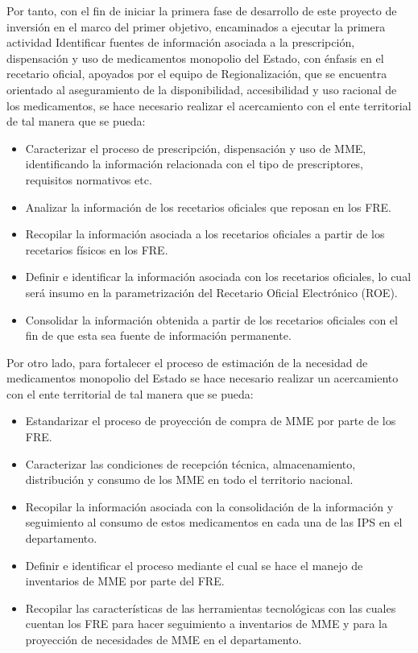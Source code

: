 \documentclass[
]{book}
\begin{document}
Por tanto, con el fin de iniciar la primera fase de desarrollo de este proyecto de inversión en el marco del primer objetivo, encaminados a ejecutar la primera actividad Identificar fuentes de información asociada a la prescripción, dispensación y uso de medicamentos monopolio del Estado, con énfasis en el recetario oficial, apoyados por el equipo de Regionalización, que se encuentra orientado al aseguramiento de la disponibilidad, accesibilidad y uso racional de los medicamentos, se hace necesario realizar el acercamiento con el ente territorial de tal manera que se pueda:

\begin{itemize}
\item
  Caracterizar el proceso de prescripción, dispensación y uso de MME, identificando la información relacionada con el tipo de prescriptores, requisitos normativos etc.
\item
  Analizar la información de los recetarios oficiales que reposan en los FRE.
\item
  Recopilar la información asociada a los recetarios oficiales a partir de los recetarios físicos en los FRE.
\item
  Definir e identificar la información asociada con los recetarios oficiales, lo cual será insumo en la parametrización del Recetario Oficial Electrónico (ROE).
\item
  Consolidar la información obtenida a partir de los recetarios oficiales con el fin de que esta sea fuente de información permanente.
\end{itemize}

Por otro lado, para fortalecer el proceso de estimación de la necesidad de medicamentos monopolio del Estado se hace necesario realizar un acercamiento con el ente territorial de tal manera que se pueda:

\begin{itemize}
\item
  Estandarizar el proceso de proyección de compra de MME por parte de los FRE.
\item
  Caracterizar las condiciones de recepción técnica, almacenamiento, distribución y consumo de los MME en todo el territorio nacional.
\item
  Recopilar la información asociada con la consolidación de la información y seguimiento al consumo de estos medicamentos en cada una de las IPS en el departamento.
\item
  Definir e identificar el proceso mediante el cual se hace el manejo de inventarios de MME por parte del FRE.
\item
  Recopilar las características de las herramientas tecnológicas con las cuales cuentan los FRE para hacer seguimiento a inventarios de MME y para la proyección de necesidades de MME en el departamento.
\end{itemize}
\end{document}

